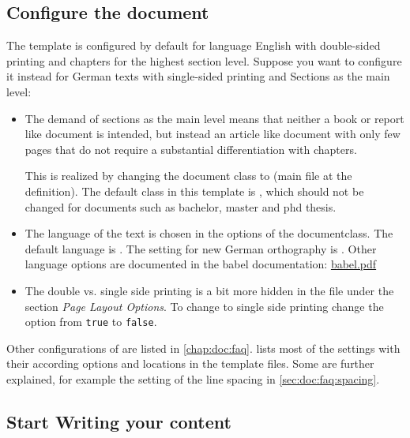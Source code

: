 \subsection{Configure the document}
\label{sec:doc:config:latex}
The template is configured by default for language English with double-sided printing and chapters for the highest section level. Suppose you want to configure it instead for German texts with single-sided printing and Sections as the main level:

\begin{itemize}
\item The demand of sections as the main level means that neither a book or report like document is intended, but instead an article like document with only few pages that do not require a substantial differentiation with chapters.

This is realized by changing the document class to  (main file at the  definition). The default class in this template is , which should not be changed for documents such as bachelor, master and phd thesis.
%
\item The language of the text is chosen in the options of the documentclass. The default language is . The setting for new German orthography is . Other language options are documented in the babel documentation: \href{http://mirrors.ctan.org/macros/latex/required/babel/babel.pdf}{babel.pdf}
%
\item The double vs. single side printing is a bit more hidden in the file  under the section \emph{Page Layout Options}. To change to single side printing change the option  from \texttt{true} to \texttt{false}.
\end{itemize}

Other configurations of \latex are listed in \cref{chap:doc:faq}.  lists most of the settings with their according options and locations in the template files. Some are further explained, 
for example the setting of the line spacing in \cref{sec:doc:faq:spacing}.

\subsection{Start Writing your content}

